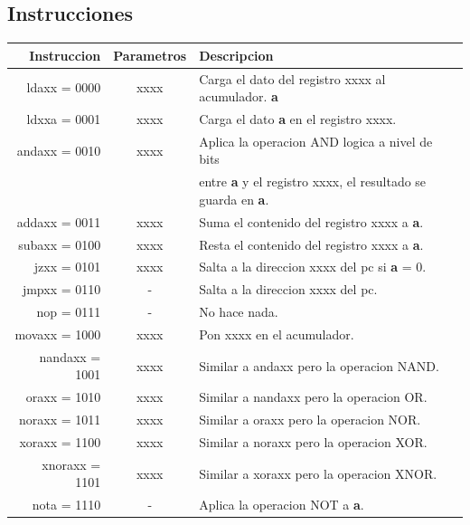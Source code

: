\documentclass[11pt,letterpaper]{article} %
\begin{document}
\subsection{Instrucciones}
\begin{tabular}{|r|c|l|} \hline
  \textbf{Instruccion} & \textbf{Parametros} & \textbf{Descripcion}\\ \hline
  ldaxx = 0000 & xxxx & Carga el dato del registro xxxx al acumulador. \textbf{a}\\ \hline
  ldxxa = 0001 & xxxx & Carga el dato \textbf{a} en el registro xxxx. \\ \hline
  andaxx = 0010 & xxxx & Aplica la operacion AND logica a nivel de bits\\
                       & & entre \textbf{a} y el registro xxxx, el resultado se guarda en \textbf{a}. \\ \hline
  addaxx = 0011 & xxxx & Suma el contenido del registro xxxx a \textbf{a}. \\ \hline
  subaxx = 0100 & xxxx & Resta el contenido del registro xxxx a \textbf{a}. \\ \hline
  jzxx = 0101 & xxxx & Salta a la direccion xxxx del pc si \textbf{a} = 0. \\ \hline
  jmpxx = 0110 & - & Salta a la direccion xxxx del pc. \\ \hline
  nop = 0111 & - & No hace nada. \\ \hline
  movaxx = 1000 & xxxx & Pon xxxx en el acumulador.\\ \hline
  nandaxx = 1001 & xxxx & Similar a andaxx pero la operacion NAND.\\ \hline
  oraxx = 1010 & xxxx & Similar a nandaxx pero la operacion OR.\\ \hline
  noraxx = 1011 & xxxx & Similar a oraxx pero la operacion NOR.\\ \hline
  xoraxx = 1100 & xxxx & Similar a noraxx pero la operacion XOR.\\ \hline
  xnoraxx = 1101 & xxxx & Similar a xoraxx pero la operacion XNOR.\\ \hline
  nota = 1110 & - & Aplica la operacion NOT a \textbf{a}.\\ \hline
\end{tabular}
\end{document}

